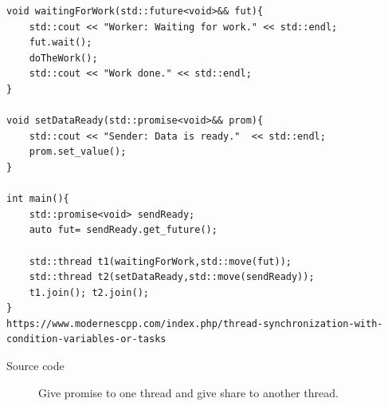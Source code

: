 \documentclass[a4paper,11pt,twoside]{book}
\begin{document}
\begin{itemize}
\begin{lstlisting}[numbers=none]
void waitingForWork(std::future<void>&& fut){
	std::cout << "Worker: Waiting for work." << std::endl;
	fut.wait();
	doTheWork();
	std::cout << "Work done." << std::endl;
}

void setDataReady(std::promise<void>&& prom){
	std::cout << "Sender: Data is ready."  << std::endl;
	prom.set_value();	
}

int main(){
	std::promise<void> sendReady;
	auto fut= sendReady.get_future();
	
	std::thread t1(waitingForWork,std::move(fut));
	std::thread t2(setDataReady,std::move(sendReady));
	t1.join(); t2.join();
}
https://www.modernescpp.com/index.php/thread-synchronization-with-condition-variables-or-tasks
\end{lstlisting}
\begin{description}
		\item[Source code] Give promise to one thread and give share to another thread.
\end{description}

\end{itemize}
\end{document}
